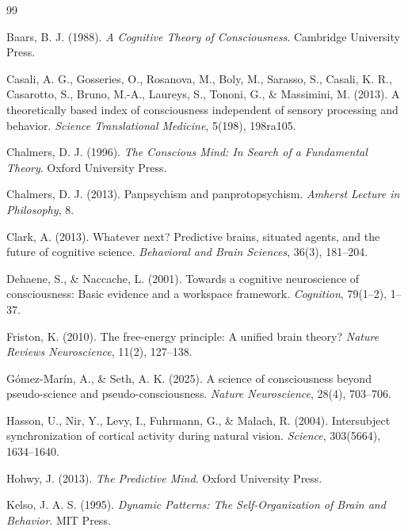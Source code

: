 \documentclass[11pt]{article}
\begin{document}
\begin{thebibliography}{99}

 Baars, B. J. (1988). \textit{A Cognitive Theory of Consciousness}. Cambridge University Press.

 Casali, A. G., Gosseries, O., Rosanova, M., Boly, M., Sarasso, S., Casali, K. R., Casarotto, S., Bruno, M.-A., Laureys, S., Tononi, G., \& Massimini, M. (2013). A theoretically based index of consciousness independent of sensory processing and behavior. \textit{Science Translational Medicine}, 5(198), 198ra105.

 Chalmers, D. J. (1996). \textit{The Conscious Mind: In Search of a Fundamental Theory}. Oxford University Press.

 Chalmers, D. J. (2013). Panpsychism and panprotopsychism. \textit{Amherst Lecture in Philosophy}, 8.

 Clark, A. (2013). Whatever next? Predictive brains, situated agents, and the future of cognitive science. \textit{Behavioral and Brain Sciences}, 36(3), 181--204.

 Dehaene, S., \& Naccache, L. (2001). Towards a cognitive neuroscience of consciousness: Basic evidence and a workspace framework. \textit{Cognition}, 79(1--2), 1--37.

 Friston, K. (2010). The free-energy principle: A unified brain theory? \textit{Nature Reviews Neuroscience}, 11(2), 127--138.

 G\'omez-Mar\'in, A., \& Seth, A. K. (2025). A science of consciousness beyond pseudo-science and pseudo-consciousness. \textit{Nature Neuroscience}, 28(4), 703--706.

 Hasson, U., Nir, Y., Levy, I., Fuhrmann, G., \& Malach, R. (2004). Intersubject synchronization of cortical activity during natural vision. \textit{Science}, 303(5664), 1634--1640.

 Hohwy, J. (2013). \textit{The Predictive Mind}. Oxford University Press.

 Kelso, J. A. S. (1995). \textit{Dynamic Patterns: The Self-Organization of Brain and Behavior}. MIT Press.


\end{thebibliography}
\end{document}

